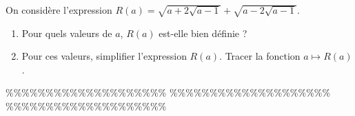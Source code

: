 



\begin{exercice}
On consid\`ere l'expression $R(a)=\sqrt{a+2\sqrt{a-1}}+\sqrt{a-2\sqrt{a-1}}$.
\begin{enumerate}
 \item Pour quels valeurs de $a$, $R(a)$ est-elle bien d\'efinie ? 
\item Pour ces valeurs, simplifier l'expression $R(a)$. Tracer la fonction $a\mapsto R(a)$.
\end{enumerate}
\end{exercice}


\%\%\%\%\%\%\%\%\%\%\%\%\%\%\%\%\%\%\%\%
\%\%\%\%\%\%\%\%\%\%\%\%\%\%\%\%\%\%\%\%
\%\%\%\%\%\%\%\%\%\%\%\%\%\%\%\%\%\%\%\%



